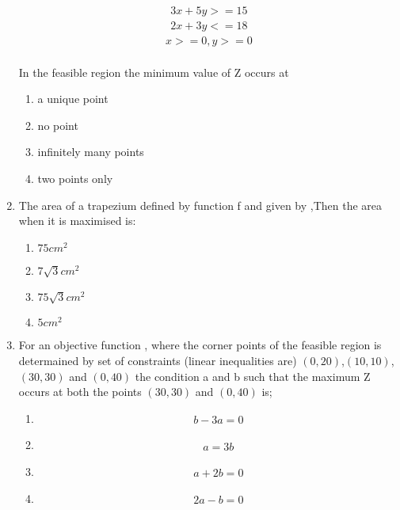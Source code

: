 \documentclass{article}
\begin{document}
\begin{enumerate}
	\begin{align}
		   3x+5y>=15
	\end{align}
	\begin{align}
		2x+3y<=18
	\end{align}
	\begin{align}
		 x>=0,y>=0
	\end{align}
	\\	In the feasible region the minimum value of Z occurs at
		\\
		\begin{enumerate}[label = (\Alph*)]
			\item a unique point
			\item no point
			\item infinitely many points
			\item two points only
		\end{enumerate}
	\item The area of a trapezium  defined by function f and given by ,Then the area when it is maximised is:
		\begin{enumerate}[label=(\Alph*)]
			\item $75cm^2$
			\item $7\sqrt{3}cm^2$
			\item $75\sqrt{3}cm^2$
			\item $5cm^2$
		\end{enumerate}
	\item For an objective function , where  the corner points of the feasible region is determained by set of constraints (linear inequalities are) $(0,20)$,$(10,10)$,$(30,30)$ and $(0,40)$ the condition a and b such that the maximum Z occurs at both the points $(30,30)$ and $(0,40)$ is;
		\begin{enumerate}[label=(\Alph*)]
			\item 
				\begin{align}
				b-3a=0
				\end{align}
			\item 
				\begin{align}
				a=3b
				\end{align}
			\item 
				\begin{align}
				a+2b=0
                                \end{align}
			\item 
                               \begin{align}
				2a-b=0

\end{align}
\end{enumerate}
\end{enumerate}
\end{document}
